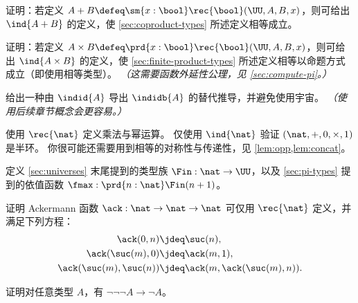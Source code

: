 \begin{ex}\label{ex:sum-via-bool}
%
证明：若定义 $A + B \defeq \sm{x:\bool} \rec{\bool}(\UU,A,B,x)$，则可给出 $\ind{A+B}$ 的定义，使 \cref{sec:coproduct-types} 所述定义相等成立。
\end{ex}

\begin{ex}\label{ex:prod-via-bool}
%
证明：若定义 $A \times B \defeq \prd{x:\bool}\rec{\bool}(\UU,A,B,x)$，则可给出 $\ind{A\times B}$ 的定义，使 \cref{sec:finite-product-types} 所述定义相等以命题方式成立（即使用相等类型）。
\emph{（这需要函数外延性公理，见 \cref{sec:compute-pi}。）}
\end{ex}

\begin{ex}\label{ex:pm-to-ml}
给出一种由 $\indid{A}$ 导出 $\indidb{A}$ 的替代推导，并避免使用宇宙。
  \emph{（使用后续章节概念会更容易。）}
\end{ex}

\begin{ex}\label{ex:nat-semiring}
  使用 $\rec{\nat}$ 定义乘法与幂运算。
  仅使用 $\ind{\nat}$ 验证 $(\nat,+,0,\times,1)$ 是半环。
  你很可能还需要用到相等的对称性与传递性，见 \cref{lem:opp,lem:concat}。
\end{ex}

\begin{ex}\label{ex:fin}
  定义 \cref{sec:universes} 末尾提到的类型族 $\Fin : \nat \to \UU$，以及 \cref{sec:pi-types} 提到的依值函数 $\fmax : \prd{n:\nat} \Fin(n+1)$。
\end{ex}

\begin{ex}\label{ex:ackermann}
  证明 Ackermann 函数 $\ack : \nat \to \nat \to \nat$ 可仅用 $\rec{\nat}$ 定义，并满足下列方程：
  \begin{align*}
    \ack(0,n) &\jdeq \suc(n), \\
    \ack(\suc(m),0) &\jdeq \ack(m,1), \\
    \ack(\suc(m),\suc(n)) &\jdeq \ack(m,\ack(\suc(m),n)).
  \end{align*}
\end{ex}

\begin{ex}\label{ex:neg-ldn}
  证明对任意类型 $A$，有 $\neg\neg\neg A \to \neg A$。
\end{ex}

